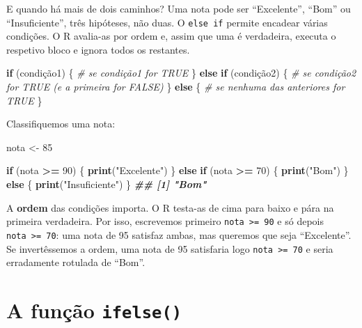 \documentclass[
  portuguese,
  11pt,
  openany]{book}
\newenvironment{Shaded}{\begin{snugshade}}{\end{snugshade}}
\newcommand{\CommentTok}[1]{\textcolor[rgb]{0.56,0.35,0.01}{\textit{#1}}}
\newcommand{\ControlFlowTok}[1]{\textcolor[rgb]{0.13,0.29,0.53}{\textbf{#1}}}
\newcommand{\DecValTok}[1]{\textcolor[rgb]{0.00,0.00,0.81}{#1}}
\newcommand{\DocumentationTok}[1]{\textcolor[rgb]{0.56,0.35,0.01}{\textbf{\textit{#1}}}}
\newcommand{\FunctionTok}[1]{\textcolor[rgb]{0.13,0.29,0.53}{\textbf{#1}}}
\newcommand{\NormalTok}[1]{#1}
\newcommand{\OtherTok}[1]{\textcolor[rgb]{0.56,0.35,0.01}{#1}}
\newcommand{\SpecialCharTok}[1]{\textcolor[rgb]{0.81,0.36,0.00}{\textbf{#1}}}
\newcommand{\StringTok}[1]{\textcolor[rgb]{0.31,0.60,0.02}{#1}}
\begin{document}
E quando há mais de dois caminhos? Uma nota pode ser ``Excelente'', ``Bom'' ou
``Insuficiente'', três hipóteses, não duas. O \texttt{else\ if} permite encadear várias
condições. O R avalia-as por ordem e, assim que uma é verdadeira, executa o
respetivo bloco e ignora todos os restantes.

\begin{Shaded}
\begin{Highlighting}[]
\ControlFlowTok{if}\NormalTok{ (condição1) \{}
  \CommentTok{\# se condição1 for TRUE}
\NormalTok{\} }\ControlFlowTok{else} \ControlFlowTok{if}\NormalTok{ (condição2) \{}
  \CommentTok{\# se condição2 for TRUE (e a primeira for FALSE)}
\NormalTok{\} }\ControlFlowTok{else}\NormalTok{ \{}
  \CommentTok{\# se nenhuma das anteriores for TRUE}
\NormalTok{\}}
\end{Highlighting}
\end{Shaded}

Classifiquemos uma nota:

\begin{Shaded}
\begin{Highlighting}[]
\NormalTok{nota }\OtherTok{\textless{}{-}} \DecValTok{85}

\ControlFlowTok{if}\NormalTok{ (nota }\SpecialCharTok{\textgreater{}=} \DecValTok{90}\NormalTok{) \{}
  \FunctionTok{print}\NormalTok{(}\StringTok{"Excelente"}\NormalTok{)}
\NormalTok{\} }\ControlFlowTok{else} \ControlFlowTok{if}\NormalTok{ (nota }\SpecialCharTok{\textgreater{}=} \DecValTok{70}\NormalTok{) \{}
  \FunctionTok{print}\NormalTok{(}\StringTok{"Bom"}\NormalTok{)}
\NormalTok{\} }\ControlFlowTok{else}\NormalTok{ \{}
  \FunctionTok{print}\NormalTok{(}\StringTok{"Insuficiente"}\NormalTok{)}
\NormalTok{\}}
\DocumentationTok{\#\# [1] "Bom"}
\end{Highlighting}
\end{Shaded}

A \textbf{ordem} das condições importa. O R testa-as de cima para baixo e pára na
primeira verdadeira. Por isso, escrevemos primeiro \texttt{nota\ \textgreater{}=\ 90} e só depois
\texttt{nota\ \textgreater{}=\ 70}: uma nota de 95 satisfaz ambas, mas queremos que seja ``Excelente''.
Se invertêssemos a ordem, uma nota de 95 satisfaria logo \texttt{nota\ \textgreater{}=\ 70} e seria
erradamente rotulada de ``Bom''.

\section{\texorpdfstring{A função \texttt{ifelse()}}{A função ifelse()}}\label{a-funuxe7uxe3o-ifelse}
\end{document}
